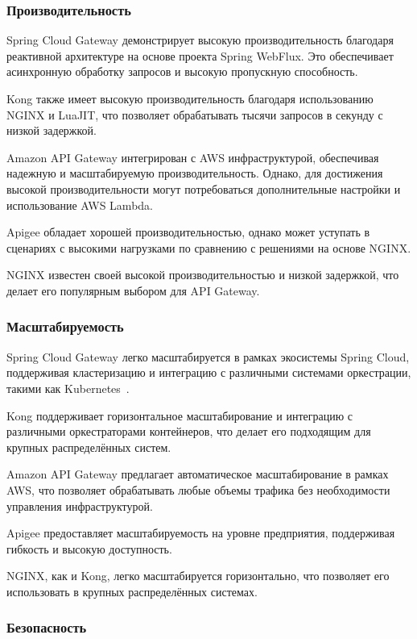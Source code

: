 \subsubsection{Производительность}

Spring Cloud Gateway демонстрирует высокую производительность благодаря реактивной архитектуре на основе проекта Spring
WebFlux.
Это обеспечивает асинхронную обработку запросов и высокую пропускную способность.

Kong также имеет высокую производительность благодаря использованию NGINX и LuaJIT, что позволяет обрабатывать тысячи
запросов в секунду с низкой задержкой.

Amazon API Gateway интегрирован с AWS инфраструктурой, обеспечивая надежную и масштабируемую производительность.
Однако,
для достижения высокой производительности могут потребоваться дополнительные настройки и использование AWS Lambda.

Apigee обладает хорошей производительностью, однако может уступать в сценариях с высокими нагрузками по сравнению с
решениями на основе NGINX\@.

NGINX известен своей высокой производительностью и низкой задержкой, что делает его популярным выбором для API Gateway.

\subsubsection{Масштабируемость}

Spring Cloud Gateway легко масштабируется в рамках экосистемы Spring Cloud, поддерживая кластеризацию и интеграцию с
различными системами оркестрации, такими как Kubernetes~\cite{carnell2021spring}.

Kong поддерживает горизонтальное масштабирование и интеграцию с различными оркестраторами контейнеров, что делает его
подходящим для крупных распределённых систем.

Amazon API Gateway предлагает автоматическое масштабирование в рамках AWS, что позволяет обрабатывать любые объемы
трафика без необходимости управления инфраструктурой.

Apigee предоставляет масштабируемость на уровне предприятия, поддерживая гибкость и высокую доступность.

NGINX, как и Kong, легко масштабируется горизонтально, что позволяет его использовать в крупных распределённых системах.

\subsubsection{Безопасность}

